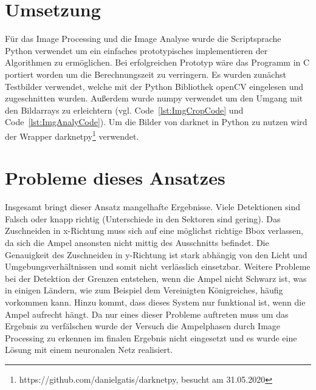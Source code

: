 \documentclass[a4paper,oneside,12pt]{report}
\begin{document}
\begin{onehalfspace}
		\section{Umsetzung}
		Für das Image Processing und die Image Analyse wurde die Scriptsprache Python verwendet um ein einfaches prototypisches implementieren der Algorithmen zu ermöglichen. Bei erfolgreichen Prototyp wäre das Programm in C portiert worden um die Berechnungszeit zu verringern. Es wurden zunächst Testbilder verwendet, welche mit der Python Bibliothek openCV eingelesen und zugeschnitten wurden. Außerdem wurde numpy verwendet um den Umgang mit den Bildarrays zu erleichtern (vgl. Code~\ref{lst:ImgCropCode} und Code~\ref{lst:ImgAnalyCode}). Um die Bilder von darknet in Python zu nutzen wird der Wrapper darknetpy\footnote{https://github.com/danielgatis/darknetpy, besucht am 31.05.2020} verwendet.
		
		
		\section{Probleme dieses Ansatzes}
		Insgesamt bringt dieser Ansatz mangelhafte Ergebnisse. Viele Detektionen sind Falsch oder knapp richtig (Unterschiede in den Sektoren sind gering). Das Zuschneiden in x-Richtung muss sich auf eine möglichst richtige Bbox verlassen, da sich die Ampel ansonsten nicht mittig des Ausschnitts befindet. Die Genauigkeit des Zuschneiden in y-Richtung ist stark abhängig von den Licht und Umgebungsverhältnissen und somit nicht verlässlich einsetzbar. Weitere Probleme bei der Detektion der Grenzen entstehen, wenn die Ampel nicht Schwarz ist, was in einigen Ländern, wie zum Beispiel dem Vereinigten Königreiches, häufig vorkommen kann. Hinzu kommt, dass dieses System nur funktional ist, wenn die Ampel aufrecht hängt. Da nur eines dieser Probleme auftreten muss um das Ergebnis zu verfälschen wurde der Versuch die Ampelphasen durch Image Processing zu erkennen im finalen Ergebnis nicht eingesetzt und es wurde eine Lösung mit einem neuronalen Netz realisiert.
		
		
	\end{onehalfspace}
\end{document}
